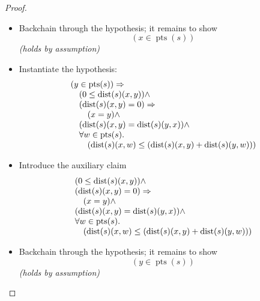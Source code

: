 \documentclass[11pt]{article}
\theoremstyle{plain}
\begin{document}
\begin{proof}
\begin{itemize}[leftmargin=2.8em, itemsep=4pt, parsep=1pt]
  \item[\textbf{11--12}] Backchain through the hypothesis; it remains to show
\begin{equation*}
(x \in \operatorname{pts}(s))
\end{equation*}
  \emph{(holds by assumption)}
  \item[\textbf{13--14}] Instantiate the hypothesis:
\begin{equation*}
\begin{array}{@{}l@{}} (y \in \operatorname{pts}(s)) \Rightarrow  \\ \quad (0 \leq \operatorname{dist}(s)(x, y)) \wedge \\ \quad (\operatorname{dist}(s)(x, y) = 0) \Rightarrow  \\ \quad \quad (x = y) \wedge \\ \quad (\operatorname{dist}(s)(x, y) = \operatorname{dist}(s)(y, x)) \wedge \\ \quad \forall w \in \operatorname{pts}(s). \\ \quad \quad (\operatorname{dist}(s)(x, w) \leq (\operatorname{dist}(s)(x, y) + \operatorname{dist}(s)(y, w))) \end{array}
\end{equation*}

  \item[\textbf{15}] Introduce the auxiliary claim
\begin{equation*}
\begin{array}{@{}l@{}} (0 \leq \operatorname{dist}(s)(x, y)) \wedge \\ (\operatorname{dist}(s)(x, y) = 0) \Rightarrow  \\ \quad (x = y) \wedge \\ (\operatorname{dist}(s)(x, y) = \operatorname{dist}(s)(y, x)) \wedge \\ \forall w \in \operatorname{pts}(s). \\ \quad (\operatorname{dist}(s)(x, w) \leq (\operatorname{dist}(s)(x, y) + \operatorname{dist}(s)(y, w))) \end{array}
\end{equation*}

  \item[\textbf{16--21}] Backchain through the hypothesis; it remains to show
\begin{equation*}
(y \in \operatorname{pts}(s))
\end{equation*}
  \emph{(holds by assumption)}
\end{itemize}
\end{proof}
\end{document}
